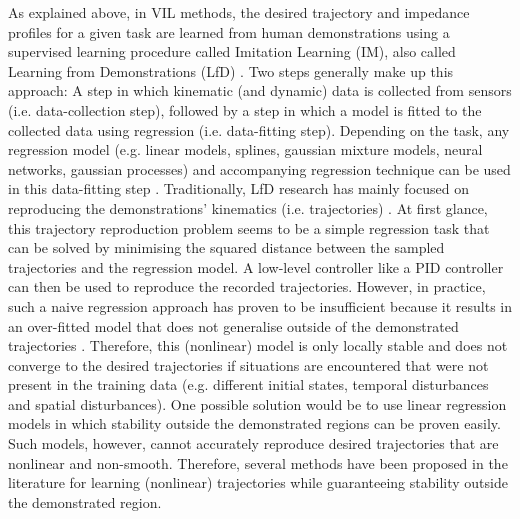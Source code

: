 As explained above, in VIL methods, the desired trajectory and impedance profiles for a given task are learned from human demonstrations using a supervised learning procedure called Imitation Learning (IM), also called Learning from Demonstrations (LfD) \cite{ravichandarRecentAdvancesRobot2020}. Two steps generally make up this approach: A step in which kinematic (and dynamic) data is collected from sensors (i.e. data-collection step), followed by a step in which a model is fitted to the collected data using regression (i.e. data-fitting step). Depending on the task, any regression model (e.g. linear models, splines, gaussian mixture models, neural networks, gaussian processes) and accompanying regression technique can be used in this data-fitting step \cite{kroemerReviewRobotLearning2021,husseinImitationLearningSurvey2017}. Traditionally, LfD research has mainly focused on reproducing the demonstrations' kinematics (i.e. trajectories) \cite{siReviewManipulationSkill2021}. At first glance, this trajectory reproduction problem seems to be a simple regression task that can be solved by minimising the squared distance between the sampled trajectories and the regression model. A low-level controller like a PID controller can then be used to reproduce the recorded trajectories. However, in practice, such a naive regression approach has proven to be insufficient because it results in an over-fitted model that does not generalise outside of the demonstrated trajectories \cite{sindhwaniLearningContractingVector2018}. Therefore, this (nonlinear) model is only locally stable and does not converge to the desired trajectories if situations are encountered that were not present in the training data (e.g. different initial states, temporal disturbances and spatial disturbances). One possible solution would be to use linear regression models in which stability outside the demonstrated regions can be proven easily. Such models, however, cannot accurately reproduce desired trajectories that are nonlinear and non-smooth. Therefore, several methods have been proposed in the literature for learning (nonlinear) trajectories while guaranteeing stability outside the demonstrated region.

